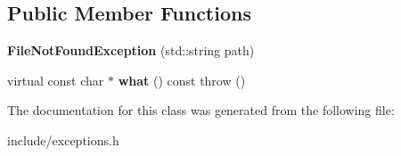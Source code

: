 \subsection*{Public Member Functions}
\begin{DoxyCompactItemize}
\item 
\hypertarget{class_file_not_found_exception_a448e085ea8a1fd74ed8cec2cba4c4c37}{{\bfseries File\+Not\+Found\+Exception} (std\+::string path)}\label{class_file_not_found_exception_a448e085ea8a1fd74ed8cec2cba4c4c37}

\item 
\hypertarget{class_file_not_found_exception_a65fad87ab27df5213e8494a19b7a8048}{virtual const char $\ast$ {\bfseries what} () const   throw ()}\label{class_file_not_found_exception_a65fad87ab27df5213e8494a19b7a8048}

\end{DoxyCompactItemize}


The documentation for this class was generated from the following file\+:\begin{DoxyCompactItemize}
\item 
include/exceptions.\+h\end{DoxyCompactItemize}
